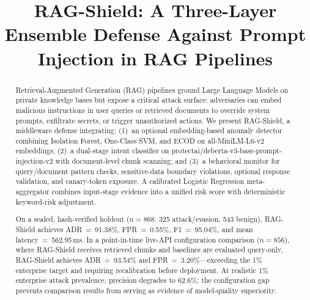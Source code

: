 ﻿\documentclass[conference]{IEEEtran}
\begin{document}
\title{RAG-Shield: A Three-Layer Ensemble Defense Against Prompt Injection
in RAG Pipelines}

\author{
  \and
}

\maketitle

\begin{abstract}
Retrieval-Augmented Generation (RAG) pipelines ground Large Language Models
on private knowledge bases but expose a critical attack surface: adversaries
can embed malicious instructions in user queries or retrieved documents to
override system prompts, exfiltrate secrets, or trigger unauthorized actions.
We present RAG-Shield, a middleware defense integrating:
(1)~an optional embedding-based anomaly detector combining Isolation Forest,
One-Class SVM, and ECOD on all-MiniLM-L6-v2 embeddings;
(2)~a dual-stage intent classifier on
protectai/deberta-v3-base-prompt-injection-v2 with document-level chunk
scanning; and
(3)~a behavioral monitor for query/document pattern checks, sensitive-data
boundary violations, optional response validation, and canary-token exposure.
A calibrated Logistic Regression meta-aggregator combines input-stage
evidence into a unified risk score with deterministic keyword-risk adjustment.

On a sealed, hash-verified holdout ($n = 868$: 325 attack/evasion,
543 benign), RAG-Shield achieves ADR~=~91.38\%, FPR~=~0.55\%,
F1~=~95.04\%, and mean latency~=~562.95\,ms.
In a point-in-time live-API configuration comparison ($n = 856$), where
RAG-Shield receives retrieved chunks and baselines are evaluated query-only,
RAG-Shield achieves ADR~=~93.54\% and FPR~=~3.20\%---exceeding the 1\%
enterprise target and requiring recalibration before deployment.
At realistic 1\% enterprise attack prevalence, precision degrades to 62.6\%;
the configuration gap prevents comparison results from serving as evidence
of model-quality superiority.
\end{abstract}
\end{document}
